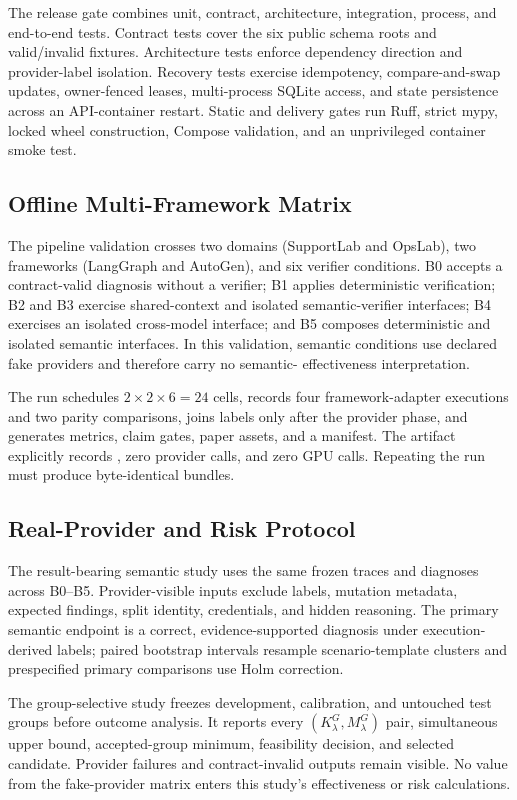 The release gate combines unit, contract, architecture, integration, process,
and end-to-end tests. Contract tests cover the six public schema roots and
valid/invalid fixtures. Architecture tests enforce dependency direction and
provider-label isolation. Recovery tests exercise idempotency, compare-and-swap
updates, owner-fenced leases, multi-process SQLite access, and state persistence
across an API-container restart. Static and delivery gates run Ruff, strict
mypy, locked wheel construction, Compose validation, and an unprivileged
container smoke test.

\subsection{Offline Multi-Framework Matrix}

The pipeline validation crosses two domains (SupportLab and OpsLab), two
frameworks (LangGraph and AutoGen), and six verifier conditions. B0 accepts a
contract-valid diagnosis without a verifier; B1 applies deterministic
verification; B2 and B3 exercise shared-context and isolated semantic-verifier
interfaces; B4 exercises an isolated cross-model interface; and B5 composes
deterministic and isolated semantic interfaces. In this validation, semantic
conditions use declared fake providers and therefore carry no semantic-
effectiveness interpretation.

The run schedules $2\times2\times6=24$ cells, records four framework-adapter
executions and two parity comparisons, joins labels only after the provider
phase, and generates metrics, claim gates, paper assets, and a manifest. The
artifact explicitly records , zero provider calls,
and zero GPU calls. Repeating the run must produce byte-identical bundles.

\subsection{Real-Provider and Risk Protocol}

The result-bearing semantic study uses the same frozen traces and diagnoses
across B0--B5. Provider-visible inputs exclude labels, mutation metadata,
expected findings, split identity, credentials, and hidden reasoning. The
primary semantic endpoint is a correct, evidence-supported diagnosis under
execution-derived labels; paired bootstrap intervals resample scenario-template
clusters and prespecified primary comparisons use Holm correction.

The group-selective study freezes development, calibration, and untouched test
groups before outcome analysis. It reports every $(K_\lambda^G,M_\lambda^G)$
pair, simultaneous upper bound, accepted-group minimum, feasibility decision,
and selected candidate. Provider failures and contract-invalid outputs remain
visible. No value from the fake-provider matrix enters this study's
effectiveness or risk calculations.
